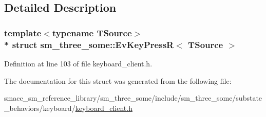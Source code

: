 \subsection{Detailed Description}
\subsubsection*{template$<$typename T\+Source$>$\\*
struct sm\+\_\+three\+\_\+some\+::\+Ev\+Key\+Press\+R$<$ T\+Source $>$}



Definition at line 103 of file keyboard\+\_\+client.\+h.



The documentation for this struct was generated from the following file\+:\begin{DoxyCompactItemize}
\item 
smacc\+\_\+sm\+\_\+reference\+\_\+library/sm\+\_\+three\+\_\+some/include/sm\+\_\+three\+\_\+some/substate\+\_\+behaviors/keyboard/\hyperlink{keyboard__client_8h}{keyboard\+\_\+client.\+h}\end{DoxyCompactItemize}
